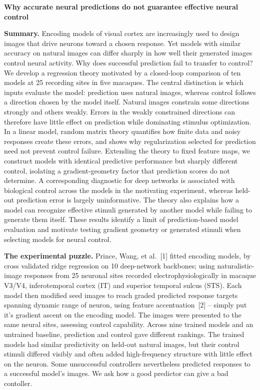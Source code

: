 \documentclass[12pt,a4paper]{article}
\newcommand{\head}[1]{\par\noindent\textbf{#1}\enspace\ignorespaces}
\begin{document}
{\large\bfseries Why accurate neural predictions do not guarantee effective neural control\par}

\textbf{Summary.}
Encoding models of visual cortex are increasingly used to design images that drive neurons toward a chosen response. Yet models with similar accuracy on natural images can differ sharply in how well their generated images control neural activity. Why does successful prediction fail to transfer to control? We develop a regression theory motivated by a closed-loop comparison of ten models at 25 recording sites in five macaques. The central distinction is which inputs evaluate the model: prediction uses natural images, whereas control follows a direction chosen by the model itself. Natural images constrain some directions strongly and others weakly. Errors in the weakly constrained directions can therefore have little effect on prediction while dominating stimulus optimization. In a linear model, random matrix theory quantifies how finite data and noisy responses create these errors, and shows why regularization selected for prediction need not prevent control failure. Extending the theory to fixed feature maps, we construct models with identical predictive performance but sharply different control, isolating a gradient-geometry factor that prediction scores do not determine. A corresponding diagnostic for deep networks is associated with biological control across the models in the motivating experiment, whereas held-out prediction error is largely uninformative. The theory also explains how a model can recognize effective stimuli generated by another model while failing to generate them itself. These results identify a limit of prediction-based model evaluation and motivate testing gradient geometry or generated stimuli when selecting models for neural control.

\head{The experimental puzzle.}
Prince, Wang, et al.~[1] fitted encoding models, by cross validated ridge regression on 10 deep-network backbones; using naturalistic-image responses from 25 neuronal sites recorded electrophysiologically in macaque V3/V4, inferotemporal cortex (IT) and superior temporal sulcus (STS). 
Each model then modified seed images to reach graded predicted response targets spanning dynamic range of neuron, using feature accentuation~[2] -- simply put it's gradient ascent on the encoding model. The images were presented to the same neural sites, assessing control capability. Across nine trained models and an untrained baseline, prediction and control gave different rankings. The trained models had similar predictivity on held-out natural images, but their control stimuli differed visibly and often added high-frequency structure with little effect on the neuron. Some unsuccessful controllers nevertheless predicted responses to a successful model's images. We ask how a good predictor can give a bad contoller. %
\end{document}
